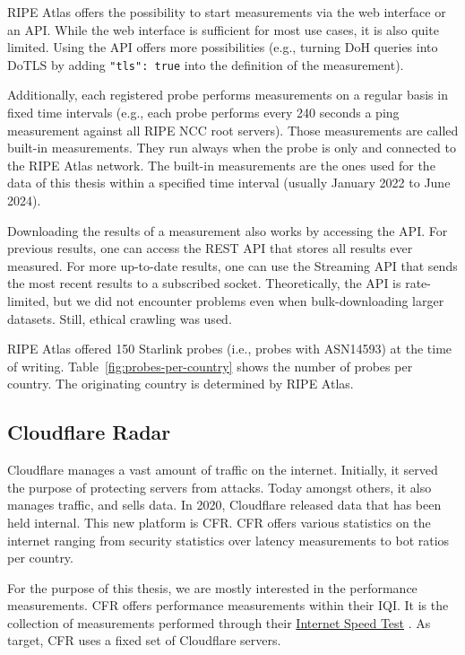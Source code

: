 RIPE Atlas offers the possibility to start measurements via the web interface
or an API. While the web interface is sufficient for most use cases, it is also
quite limited. Using the API offers more possibilities (e.g., turning DoH
queries into DoTLS by adding \verb|"tls": true| into the definition of the
measurement).

Additionally, each registered probe performs measurements on a regular basis in
fixed time intervals (e.g., each probe performs every 240 seconds a ping
measurement against all RIPE NCC root servers). Those measurements are called
built-in measurements. They run always when the probe is only and connected to
the RIPE Atlas network. The built-in measurements are the ones used for the
data of this thesis within a specified time interval (usually January 2022 to
June 2024).

Downloading the results of a measurement also works by accessing the API. For
previous results, one can access the REST API that stores all results ever
measured. For more up-to-date results, one can use the Streaming API that sends
the most recent results to a subscribed socket. Theoretically, the API is
rate-limited, but we did not encounter problems even when bulk-downloading
larger datasets. Still, ethical crawling was used.

RIPE Atlas offered 150 Starlink probes (i.e., probes with ASN14593) at the time
of writing. Table~\ref{fig:probes-per-country} shows the number of probes per
country. The originating country is determined by RIPE Atlas.
\subsection{Cloudflare Radar} \label{sec:cloudflare-radar}

Cloudflare manages a vast amount of traffic on the internet. Initially, it
served the purpose of protecting servers from attacks. Today amongst others, it
also manages traffic, and sells data. In 2020, Cloudflare released data that
has been held internal. This new platform is \ac{CFR}. \ac{CFR} offers various
statistics on the internet ranging from security statistics over latency
measurements to bot ratios per country.

For the purpose of this thesis, we are mostly interested in the performance
measurements. \ac{CFR} offers performance measurements within their \ac{IQI}.
It is the collection of measurements performed through their
\href{https://speed.cloudflare.com/}{Internet Speed Test}
\cite{DavidBelson2023, CloudflareRadarDocsIQI}. As target, \ac{CFR} uses a
fixed set of Cloudflare servers.

